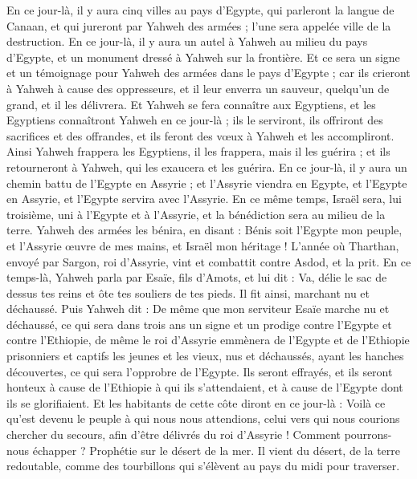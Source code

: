\begin{multicols}{2}
En ce jour-là, il y aura cinq villes au pays d'Egypte, qui parleront la langue de Canaan, et qui jureront par Yahweh des armées ; l'une sera appelée ville de la destruction.
En ce jour-là, il y aura un autel à Yahweh au milieu du pays d'Egypte, et un monument dressé à Yahweh sur la frontière.
Et ce sera un signe et un témoignage pour Yahweh des armées dans le pays d'Egypte ; car ils crieront à Yahweh à cause des oppresseurs, et il leur enverra un sauveur, quelqu'un de grand, et il les délivrera.
Et Yahweh se fera connaître aux Egyptiens, et les Egyptiens connaîtront Yahweh en ce jour-là ; ils le serviront, ils offriront des sacrifices et des offrandes, et ils feront des vœux à Yahweh et les accompliront.
Ainsi Yahweh frappera les Egyptiens, il les frappera, mais il les guérira ; et ils retourneront à Yahweh, qui les exaucera et les guérira.
En ce jour-là, il y aura un chemin battu de l'Egypte en Assyrie ; et l'Assyrie viendra en Egypte, et l'Egypte en Assyrie, et l'Egypte servira avec l'Assyrie.
En ce même temps, Israël sera, lui troisième, uni à l'Egypte et à l'Assyrie, et la bénédiction sera au milieu de la terre.
Yahweh des armées les bénira, en disant : Bénis soit l'Egypte mon peuple, et l'Assyrie œuvre de mes mains, et Israël mon héritage !
\VerseOne{}L'année où Tharthan, envoyé par Sargon, roi d'Assyrie, vint et combattit contre Asdod, et la prit.
En ce temps-là, Yahweh parla par Esaïe, fils d'Amots, et lui dit : Va, délie le sac de dessus tes reins et ôte tes souliers de tes pieds. Il fit ainsi, marchant nu et déchaussé.
Puis Yahweh dit : De même que mon serviteur Esaïe marche nu et déchaussé, ce qui sera dans trois ans un signe et un prodige contre l'Egypte et contre l'Ethiopie,
de même le roi d'Assyrie emmènera de l'Egypte et de l'Ethiopie prisonniers et captifs les jeunes et les vieux, nus et déchaussés, ayant les hanches découvertes, ce qui sera l'opprobre de l'Egypte.
Ils seront effrayés, et ils seront honteux à cause de l'Ethiopie à qui ils s'attendaient, et à cause de l'Egypte dont ils se glorifiaient.
Et les habitants de cette côte diront en ce jour-là : Voilà ce qu'est devenu le peuple à qui nous nous attendions, celui vers qui nous courions chercher du secours, afin d'être délivrés du roi d'Assyrie ! Comment pourrons-nous échapper ?
\VerseOne{}Prophétie sur le désert de la mer. Il vient du désert, de la terre redoutable, comme des tourbillons qui s'élèvent au pays du midi pour traverser.

\end{multicols}
